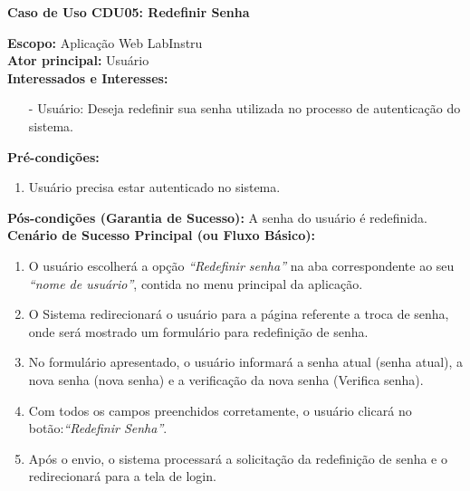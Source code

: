 	\begin{mdframed}

		\textbf{Caso de Uso CDU05: Redefinir Senha}\\

		\begin{flushleft}

		\textbf{Escopo:} Aplicação Web LabInstru\\

		\textbf{Ator principal:} Usuário\\

		\textbf{Interessados e Interesses:}
		\begin{itemize}
			\item[-] Usuário: Deseja redefinir sua senha utilizada no processo de autenticação do sistema.
		\end{itemize}

		\textbf{Pré-condições:}\\
			 \begin{enumerate}
			 	\item{Usuário precisa estar autenticado no sistema.}
			 \end{enumerate}

		\textbf{Pós-condições (Garantia de Sucesso):} A senha do usuário é redefinida.\\

		\textbf{Cenário de Sucesso Principal (ou Fluxo Básico):}\\
			\begin{enumerate}
			 	\item{O usuário escolherá a opção \textit{``Redefinir senha''} na aba correspondente ao seu \textit{``nome de usuário''}, contida no menu principal da aplicação.}
			 	\item{O Sistema redirecionará o usuário para a página referente a troca de senha, onde será mostrado um formulário para redefinição de senha.}
			 	\item{No formulário apresentado, o usuário informará a senha atual (senha atual), a nova senha (nova senha) e a verificação da nova senha (Verifica senha).}
			 	\item{Com todos os campos preenchidos corretamente, o usuário clicará no botão:\textit{``Redefinir Senha''}.}
			 	\item{Após o envio, o sistema processará a solicitação da redefinição de senha e o redirecionará para a tela de login.}
			 \end{enumerate}


\end{flushleft}
\end{mdframed}
